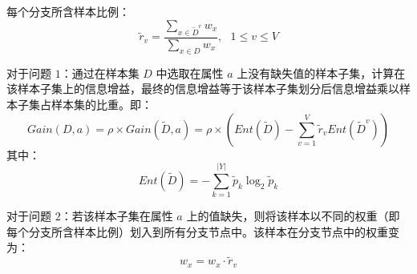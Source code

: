 \documentclass[12pt, a4paper]{article} %
\begin{document}
每个分支所含样本比例：
\begin{equation*}
    \tilde{r}_v = \frac{\sum_{x \in \tilde{D}^v} w_x}{\sum_{x \in D} w_x}, \ \ \ 1 \le v \le V
\end{equation*}

对于问题 $1$：通过在样本集 $D$ 中选取在属性 $a$ 上没有缺失值的样本子集，计算在该样本子集上的信息增益，最终的信息增益等于该样本子集划分后信息增益乘以样本子集占样本集的比重。即：
\begin{equation*}
    Gain(D, a) = \rho \times Gain(\tilde{D}, a) = \rho \times \left(
        Ent (\tilde{D}) - \sum_{v = 1}^{V} \tilde{r}_v Ent (\tilde{D}^v)
    \right)
\end{equation*}
其中：
\begin{equation*}
    Ent(\tilde{D}) = - \sum_{k = 1}^{|Y|} \tilde{p}_k \log_2 \tilde{p}_k
\end{equation*}

对于问题 $2$：若该样本子集在属性 $a$ 上的值缺失，则将该样本以不同的权重（即每个分支所含样本比例）划入到所有分支节点中。该样本在分支节点中的权重变为：
\begin{equation*}
    w_x = w_x \cdot \tilde{r}_v
\end{equation*}
\end{document}
